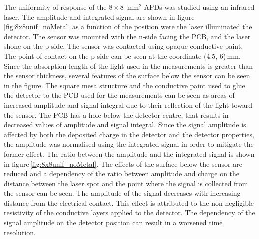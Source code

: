\documentclass{article}
\begin{document}
The uniformity of response of the $8 \times 8$~mm$^2$ APDs was studied using an infrared laser.
The amplitude and integrated signal are shown in figure\,\ref{fig:8x8unif_noMetal} as a function of the position were the laser illuminated the detector.
The sensor was mounted with the n-side facing the PCB, and the laser shone on the p-side.
The sensor was contacted using opaque conductive paint.
The point of contact on the p-side can be seen at the coordinate (4.5, 6)\,mm.
Since the absorption length of the light used in the measurements is greater than the sensor thickness, several features of the surface below the sensor can be seen in the figure.
The square mesa structure and the conductive paint used to glue the detector to the PCB used for the measurements can be seen as areas of increased amplitude and signal integral due to their reflection of the light toward the sensor.
The PCB has a hole below the detector centre, that results in decreased values of amplitude and signal integral.
Since the signal amplitude is affected by both the deposited charge in the detector and the detector properties, the amplitude was normalised using the integrated signal in order to mitigate the former effect.
The ratio between the amplitude and the integrated signal is shown in figure\,\ref{fig:8x8unif_noMetal}.
The effects of the surface below the sensor are reduced and a dependency of the ratio between amplitude and charge on the distance between the laser spot and the point where the signal is collected from the sensor can be seen.
The amplitude of the signal decreases with increasing distance from the electrical contact.
This effect is attributed to the non-negligible resistivity of the conductive layers applied to the detector.
The dependency of the signal amplitude on the detector position can result in a worsened time resolution.
\end{document}

